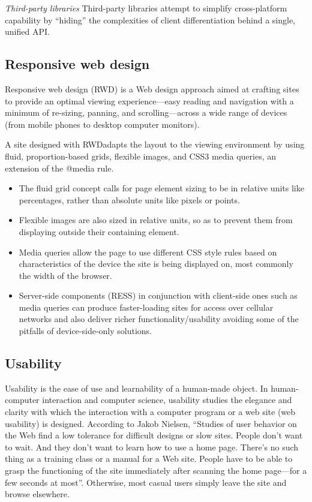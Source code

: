 	\emph{Third-party libraries}
	\newline
	Third-party libraries attempt to simplify cross-platform capability by ``hiding'' the complexities of client differentiation behind a single, unified API.


\subsection {Responsive web design}
	Responsive web design (RWD)\cite{ wiki:RWD, CSS3} is a Web design approach aimed at crafting sites to provide an optimal viewing experience—easy reading and navigation with a minimum of re-sizing, panning, and scrolling—across a wide range of devices (from mobile phones to desktop computer monitors).

	A site designed with RWD\cite{pettit, ethan}adapts the layout to the viewing environment by using fluid, proportion-based grids, flexible images, and CSS3 media queries, an extension of the @media rule.
    \begin{itemize}
	\item The fluid grid concept calls for page element sizing to be in relative units like percentages, rather than absolute units like pixels or points. 
	\item Flexible images are also sized in relative units, so as to prevent them from displaying outside their containing element. 
	\item Media queries allow the page to use different CSS style rules based on characteristics of the device the site is being displayed on, most commonly the width of the browser. 
	\item Server-side components (RESS) in conjunction with client-side ones such as media queries can produce faster-loading sites for access over cellular networks and also deliver richer functionality/usability avoiding some of the pitfalls of device-side-only solutions.
	\end{itemize}

\subsection {Usability}
     Usability is the ease of use and learnability of a human-made object. In human-computer interaction and computer science, usability studies the elegance and clarity with which the interaction with a computer program or a web site (web usability) is designed.
	 According to Jakob Nielsen, ``Studies of user behavior on the Web find a low tolerance for difficult designs or slow sites. People don't want to wait. And they don't want to learn how to use a home page. There's no such thing as a training class or a manual for a Web site. People have to be able to grasp the functioning of the site immediately after scanning the home page—for a few seconds at most''\cite{wiki:usability}. Otherwise, most casual users simply leave the site and browse elsewhere.

